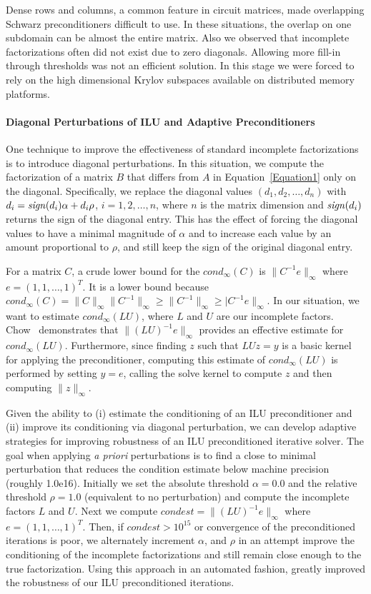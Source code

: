 \documentclass[10pt,fleqn]{article}
\newcommand{\sign}{{\it sign}}
\begin{document}
Dense rows and columns, a common feature 
in circuit matrices, made overlapping Schwarz preconditioners
difficult to use.  In these situations, the overlap on one subdomain
can be almost the entire matrix.  Also we observed that incomplete
factorizations often did not exist due to zero diagonals.  Allowing more
fill-in through thresholds was not an efficient solution.  In this stage we 
were forced to rely on the high dimensional Krylov subspaces available
on distributed memory platforms.  

\paragraph{Diagonal Perturbations of ILU and Adaptive Preconditioners}
One technique to improve the effectiveness of standard
incomplete factorizations is to introduce diagonal perturbations.  In
this situation, we compute the factorization of a matrix $B$ that
differs from $A$ in Equation~\ref{Equation1} only on the diagonal.
Specifically, we replace the diagonal values $(d_1, d_2, \ldots, d_n)$
with $d_i = \sign(d_i)\alpha + d_i\rho$, $i=1, 2, \ldots, n$, where
$n$ is the matrix dimension and $\sign(d_i)$ returns
the sign of the diagonal entry.  This has the effect of
forcing the diagonal values to have a minimal magnitude of $\alpha$ and
to increase each value by an amount proportional to $\rho$, and still keep
the sign of the original diagonal entry.

For a matrix $C$, a crude lower bound for the $cond_\infty(C)$ is
$\|C^{-1}e\|_\infty$ where $e = (1, 1, \ldots, 1)^T$.  It is a
lower bound because $cond_\infty(C) = \|C\|_\infty\|C^{-1}\|_\infty
\ge \|C^{-1}\|_\infty \ge |C^{-1}e\|_\infty$.
In our situation, we want to estimate $cond_\infty(LU)$, where $L$ and
$U$ are our incomplete factors.  Chow~\cite{Chow:97} demonstrates that
$\|(LU)^{-1}e\|_\infty$ provides an effective estimate for
$cond_\infty(LU)$.  Furthermore, since finding $z$ such that $LUz = y$
is a basic kernel for applying the preconditioner, computing this
estimate of $cond_\infty(LU)$ is performed by setting $y = e$, calling
the solve kernel to compute $z$ and then
computing $\|z\|_\infty$.

Given the ability to (i) estimate the conditioning of an ILU 
preconditioner and (ii) improve its conditioning 
via diagonal perturbation, we can develop adaptive strategies for
improving robustness of an ILU preconditioned iterative solver.  
The goal when applying {\it a priori} perturbations is to find a close to minimal
perturbation that reduces the condition estimate below machine
precision (roughly 1.0e16). Initially we set the absolute threshold 
$\alpha = 0.0$ and the relative
threshold $\rho = 1.0$ (equivalent to no perturbation) and compute the
incomplete factors $L$ and $U$.  Next we compute 
$condest = \|(LU)^{-1}e\|_\infty$ where $e = (1, 1,
\ldots, 1)^T$. Then,  if $condest > 10^{15}$ or convergence of the
preconditioned iterations is poor,
we alternately increment $\alpha$, and $\rho$ in an attempt improve
the conditioning of the incomplete factorizations and still remain
close enough to the true factorization.  Using this approach in an
automated fashion, greatly improved the robustness of our ILU
preconditioned iterations.
\end{document}
